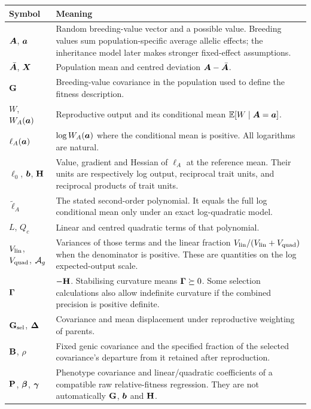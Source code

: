 \begin{longtable}{@{}p{}p{}@{}}
\toprule Symbol & Meaning \\
\midrule\endhead
$\boldsymbol{A}$, $\boldsymbol{a}$ & Random breeding-value vector and a possible value. Breeding values sum population-specific average allelic effects; the inheritance model later makes stronger fixed-effect assumptions. \\
$\bar{\boldsymbol{A}}$, $\boldsymbol{X}$ & Population mean and centred deviation $\boldsymbol{A}-\bar{\boldsymbol{A}}$. \\
$\mathbf{G}$ & Breeding-value covariance in the population used to define the fitness description. \\
$W$, $W_A(\boldsymbol{a})$ & Reproductive output and its conditional mean $\mathbb E[W\mid\boldsymbol{A}=\boldsymbol{a}]$. \\
$\ell_A(\boldsymbol{a})$ & $\log W_A(\boldsymbol{a})$ where the conditional mean is positive. All logarithms are natural. \\
$\ell_0$, $\boldsymbol{b}$, $\mathbf{H}$ & Value, gradient and Hessian of $\ell_A$ at the reference mean. Their units are respectively log output, reciprocal trait units, and reciprocal products of trait units. \\
$\widetilde\ell_A$ & The stated second-order polynomial. It equals the full log conditional mean only under an exact log-quadratic model. \\
$L$, $Q_c$ & Linear and centred quadratic terms of that polynomial. \\
$V_{\mathrm{lin}}$, $V_{\mathrm{quad}}$, $\mathcal A_g$ & Variances of those terms and the linear fraction $V_{\mathrm{lin}}/(V_{\mathrm{lin}}+V_{\mathrm{quad}})$ when the denominator is positive. These are quantities on the log expected-output scale. \\
$\boldsymbol{\Gamma}$ & $-\mathbf{H}$. Stabilising curvature means $\boldsymbol{\Gamma}\succeq0$. Some selection calculations also allow indefinite curvature if the combined precision is positive definite. \\
$\mathbf{G}_{\mathrm{sel}}$, $\boldsymbol{\Delta}$ & Covariance and mean displacement under reproductive weighting of parents. \\
$\mathbf{B}$, $\rho$ & Fixed genic covariance and the specified fraction of the selected covariance's departure from it retained after reproduction. \\
$\mathbf{P}$, $\boldsymbol{\beta}$, $\boldsymbol{\gamma}$ & Phenotype covariance and linear/quadratic coefficients of a compatible raw relative-fitness regression. They are not automatically $\mathbf{G}$, $\boldsymbol{b}$ and $\mathbf{H}$. \\
\bottomrule
\end{longtable}

